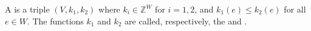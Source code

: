 A  is a triple $(V, k_1, k_2)$ where $k_i \in \mathbb{Z}^W$ for $i = 1, 2$, and $k_1(e) \leq k_2(e)$ for all $e \in W$. The functions $k_1$ and $k_2$ are called, respectively, the  and .
